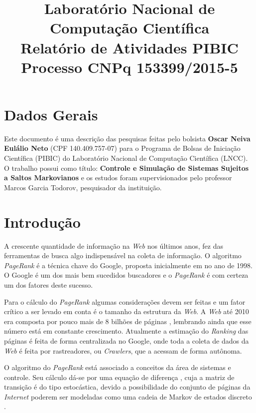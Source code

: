 \documentclass[a4paper]{report} %
\title{\textbf{Laboratório Nacional de Computação Científica}\\
Relat\'orio de Atividades PIBIC\\ 
Processo CNPq \hspace{0.2 cm} 153399/2015-5\\
\vspace{2cm}
\begin{center}
\end{center}
}
\date{}    %
\begin{document}
\maketitle  %

\section*{Dados Gerais}

Este documento é uma descrição das pesquisas feitas pelo bolsista \textbf{Oscar Neiva Eulálio Neto} (CPF 140.409.757-07) para o Programa de Bolsas de Iniciação Científica (PIBIC) do Laborat\'orio Nacional de Computa\c{c}\~ao Cient\'ifica (LNCC). O trabalho possui como título: \textbf{Controle e Simulação de Sistemas Sujeitos a Saltos Markovianos} e os estudos foram supervisionados pelo professor Marcos Garcia Todorov, pesquisador da instituição.

  
\section*{Introdução}

A crescente quantidade de informação na \textit{Web} nos últimos anos, fez das ferramentas de busca algo indispensável na coleta de informação. O algoritmo \textit{PageRank} é a técnica chave do Google, proposta inicialmente em \cite{brin2012reprint} no ano de 1998. O Google é um dos mais bem sucedidos buscadores e o \textit{PageRank} é com certeza um dos fatores deste sucesso.

Para o cálculo do \textit{PageRank} algumas considerações devem ser feitas e um fator crítico a ser levado em conta é o tamanho da estrutura da \textit{Web}. A \textit{Web} até 2010 era composta por pouco mais de 8 bilhões de páginas \cite{ishiiTAC10}, lembrando ainda que esse número está em constante crescimento. Atualmente a estimação do \textit{Ranking} das páginas é feita de forma centralizada no Google, onde toda a coleta de dados da \textit{Web} é feita por rastreadores, ou \textit{Crawlers}, que a acessam de forma autônoma.

O algoritmo do \textit{PageRank} está associado a conceitos da área de sistemas e controle. Seu cálculo dá-se por uma equação de diferença \cite{pagerankSIREV}, cuja a matriz de transição é do tipo estocástica, devido a possibilidade do conjunto de páginas da \textit{Internet} poderem ser modeladas como uma cadeia de Markov de estados discreto \cite{costafragosomarques}.
\end{document}

